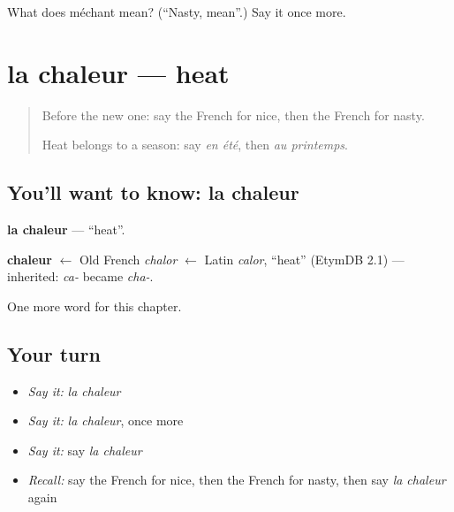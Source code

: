 \begin{tcolorbox}[breakable,colback=teal!4,colframe=teal!35!black,title={Before you move on}]
What does méchant mean? (\textquotedblleft{}Nasty, mean\textquotedblright{}.) Say it once more.
\end{tcolorbox}
\section[la chaleur]{la chaleur — heat}

\label{lesson:FR-C133-chaleur}



\begin{quote}
Before the new one: say the French for nice, then the French for nasty.

Heat belongs to a season: say \emph{en été}, then \emph{au printemps}.
\end{quote}

\subsection*{You'll want to know: la chaleur}
\textbf{la chaleur} — \textquotedblleft{}heat\textquotedblright{}.

\begin{cousinweb}
\textbf{chaleur} $\leftarrow$ Old French \emph{chalor} $\leftarrow$ Latin \emph{calor}, \textquotedblleft{}heat\textquotedblright{} (EtymDB 2.1) — inherited: \emph{ca-} became \emph{cha-}.
\end{cousinweb}

\begin{grammarlens}[title={What you've built}]
One more word for this chapter.
\end{grammarlens}

\subsection*{Your turn}
\begin{itemize}
\raggedright
  \item \emph{Say it:} \emph{la chaleur}
  \item \emph{Say it:} \emph{la chaleur}, once more
  \item \emph{Say it:} say \emph{la chaleur}
  \item \emph{Recall:} say the French for nice, then the French for nasty, then say \emph{la chaleur} again
\end{itemize}

